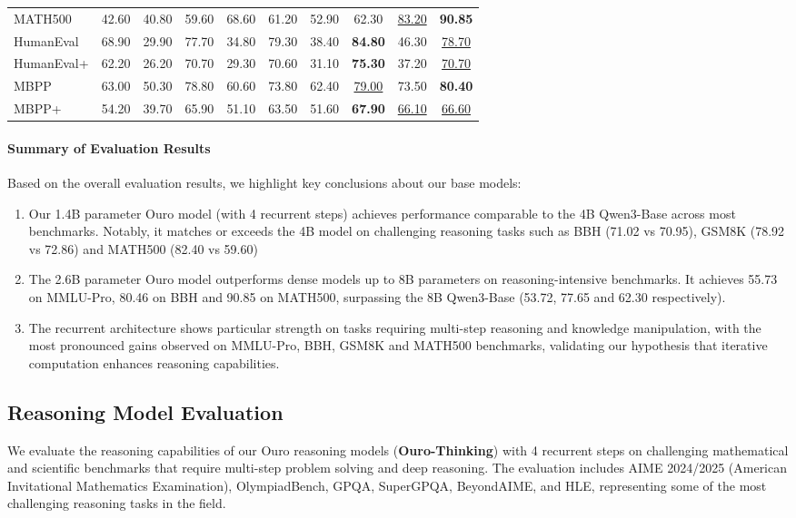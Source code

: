 \documentclass[]{bytedance_seed}
\newcommand{\1}{\mathbf{1}}
\begin{document}
\begin{table}[htbp]
\begin{tabular}{@{}lccccccccc@{}}
MATH500 & 42.60 & 40.80 & 59.60 & 68.60 & 61.20 & 52.90 & 62.30 & \underline{83.20} & \cellcolor{lightergray}\textbf{90.85} \\
HumanEval & 68.90 & 29.90 & 77.70 & 34.80 & 79.30 & 38.40 & \textbf{84.80} & 46.30 & \cellcolor{lightergray}\underline{78.70} \\
HumanEval+ & 62.20 & 26.20 & 70.70 & 29.30 & 70.60 & 31.10 & \textbf{75.30} & 37.20 & \cellcolor{lightergray}\underline{70.70} \\
MBPP & 63.00 & 50.30 & 78.80 & 60.60 & 73.80 & 62.40 & \underline{79.00} & 73.50 & \cellcolor{lightergray}\textbf{80.40} \\
MBPP+ & 54.20 & 39.70 & 65.90 & 51.10 & 63.50 & 51.60 & \textbf{67.90} & \underline{66.10} & \cellcolor{lightergray}\underline{66.60} \\
\bottomrule
\end{tabular}
\end{table}
\paragraph{Summary of Evaluation Results}
Based on the overall evaluation results, we highlight key conclusions about our base models:
\begin{enumerate}[label=(\arabic*)]
\item Our 1.4B parameter Ouro model (with 4 recurrent steps) achieves performance comparable to the 4B Qwen3-Base across most benchmarks. Notably, it matches or exceeds the 4B model on challenging reasoning tasks such as BBH (71.02 vs 70.95), GSM8K (78.92 vs 72.86) and MATH500 (82.40 vs 59.60)


\item The 2.6B parameter Ouro model outperforms dense models up to 8B parameters on reasoning-intensive benchmarks. It achieves 55.73 on MMLU-Pro, 80.46 on BBH and 90.85 on MATH500, surpassing the 8B Qwen3-Base (53.72, 77.65 and 62.30 respectively).


\item The recurrent architecture shows particular strength on tasks requiring multi-step reasoning and knowledge manipulation, with the most pronounced gains observed on MMLU-Pro, BBH, GSM8K and MATH500 benchmarks, validating our hypothesis that iterative computation enhances reasoning capabilities.
\end{enumerate}



\subsection{Reasoning Model Evaluation}
We evaluate the reasoning capabilities of our Ouro reasoning models (\textbf{Ouro-Thinking}) with 4 recurrent steps on challenging mathematical and scientific benchmarks that require multi-step problem solving and deep reasoning. The evaluation includes AIME 2024/2025 (American Invitational Mathematics Examination), OlympiadBench, GPQA, SuperGPQA, BeyondAIME, and HLE, representing some of the most challenging reasoning tasks in the field.
\end{document}
